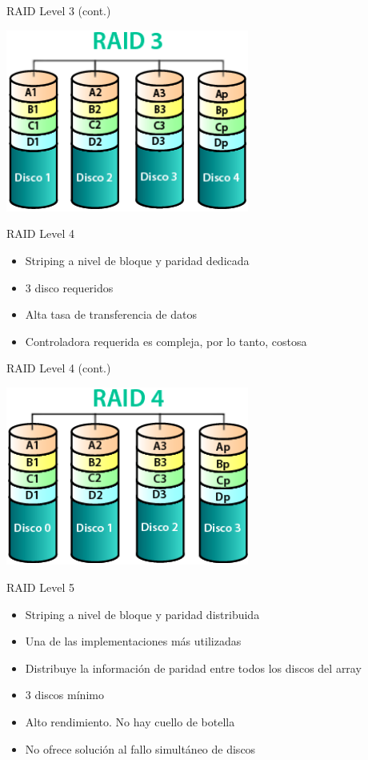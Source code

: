 \begin{frame}{RAID Level 3 (cont.)}
 \begin{center}
  \includegraphics[width=0.6\textwidth]{images/raid3.png}
 \end{center}
\end{frame}

\begin{frame}{RAID Level 4}
 \begin{itemize}
  \item Striping a nivel de bloque y paridad dedicada
  \item 3 disco requeridos
  \item Alta tasa de transferencia de datos
  \item Controladora requerida es compleja, por lo tanto, costosa
 \end{itemize}
\end{frame}

\begin{frame}{RAID Level 4 (cont.)}
 \begin{center}
  \includegraphics[width=0.6\textwidth]{images/raid4.png}
 \end{center}
\end{frame}

\begin{frame}{RAID Level 5}
 \begin{itemize}
  \item Striping a nivel de bloque y paridad distribuida
  \item Una de las implementaciones más utilizadas 
  \item Distribuye la información de paridad entre todos los discos del array
  \item 3 discos mínimo
  \item Alto rendimiento. No hay cuello de botella  
  \item No ofrece solución al fallo simultáneo de discos
 \end{itemize}
\end{frame}

